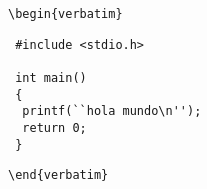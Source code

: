 \documentclass[letterpaper,12pt]{article}
\begin{document}
\pagestyle{empty}
\thispagestyle{empty}

\noindent\verb|\begin{verbatim}|
\begin{verbatim}
 #include <stdio.h>
 
 int main() 
 {
  printf(``hola mundo\n'');
  return 0;
 }
\end{verbatim}
\verb|\end{verbatim}|
\end{document}
